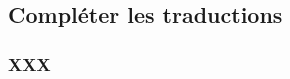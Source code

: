 \documentclass[10pt, a4paper]{../main/main}
\begin{document}

\subsection{Compléter les traductions}

\subsubsection{XXX}

\end{document}
